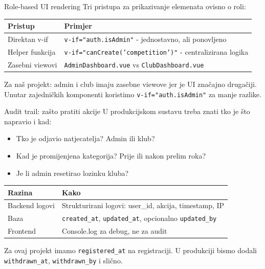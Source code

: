 \begin{frame}{Role-based UI rendering}
Tri pristupa za prikazivanje elemenata ovisno o roli:

\vspace{0.4em}
\begin{tabular}{@{}lp{8cm}@{}}
  \toprule
  \textbf{Pristup} & \textbf{Primjer} \\
  \midrule
  Direktan v-if & \texttt{v-if="auth.isAdmin"} - jednostavno, ali ponovljeno \\
  Helper funkcija & \texttt{v-if="canCreate('competition')"} - centralizirana logika \\
  Zasebni viewovi & \texttt{AdminDashboard.vue} vs \texttt{ClubDashboard.vue} \\
  \bottomrule
\end{tabular}

\vspace{0.6em}
Za naš projekt: admin i club imaju zasebne viewove jer je UI značajno drugačiji. Unutar zajedničkih komponenti koristimo \texttt{v-if="auth.isAdmin"} za manje razlike.
\end{frame}

\begin{frame}{Audit trail: zašto pratiti akcije}
U produkcijskom sustavu treba znati tko je što napravio i kad:

\vspace{0.4em}
\begin{itemize}
  \item Tko je odjavio natjecatelja? Admin ili klub?
  \item Kad je promijenjena kategorija? Prije ili nakon prelim roka?
  \item Je li admin resetirao lozinku kluba?
\end{itemize}

\vspace{0.6em}
\begin{tabular}{@{}lp{8cm}@{}}
  \toprule
  \textbf{Razina} & \textbf{Kako} \\
  \midrule
  Backend logovi & Strukturirani logovi: user\_id, akcija, timestamp, IP \\
  Baza & \texttt{created\_at}, \texttt{updated\_at}, opcionalno \texttt{updated\_by} \\
  Frontend & Console.log za debug, ne za audit \\
  \bottomrule
\end{tabular}

\vspace{0.4em}
Za ovaj projekt imamo \texttt{registered\_at} na registraciji. U produkciji bismo dodali \texttt{withdrawn\_at}, \texttt{withdrawn\_by} i slično.
\end{frame}

